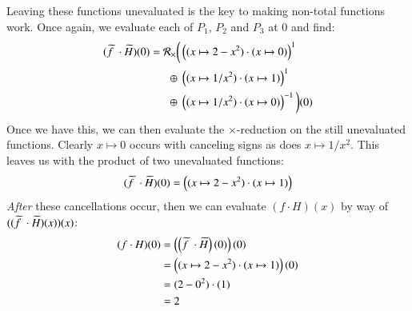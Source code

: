Leaving these functions unevaluated is the key to making non-total functions work.
Once again, we evaluate each of $P_1$, $P_2$ and $P_3$ at 0 and find:
\begin{align*}
	(\pseudo{f\;} \cdot \,\pseudo{\!H})(0) = \mathcal{R}_\times \bigg(
				& \left( (x \mapsto 2-x^2) \cdot (x \mapsto 0) \right)^1 \notag \\
		\oplus \;& \left( (x \mapsto 1/x^2) \cdot (x \mapsto 1) \right)^1 \notag \\
		\oplus \;& \left( (x \mapsto 1/x^2) \cdot (x \mapsto 0) \right)^{-1} 
	\bigg)(0)
\end{align*}
Once we have this, we can then evaluate the $\times$-reduction on the still unevaluated functions.
Clearly $x \mapsto 0$ occurs with canceling signs as does $x \mapsto 1/x^2$.
This leaves us with the product of two unevaluated functions:
\begin{equation*}
	(\pseudo{f\;}\cdot\,\pseudo{\!H})(0) = \left((x \mapsto 2-x^2) \cdot (x \mapsto 1)\right)
\end{equation*}
\emph{After} these cancellations occur, then we can evaluate $(f \cdot H)(x)$ by way of
$((\pseudo{f\;}\cdot\,\pseudo{\!H})(x))(x)$:
\begin{align*}
	(f \cdot H)(0) 
		&= \left(\left(\pseudo{f\;} \cdot \,\pseudo{\!H}\right)(0)\right)(0) \\
		&= \left((x \mapsto 2-x^2) \cdot (x \mapsto 1)\right)(0)\\
		&= (2-0^2)\cdot(1)\\
		&= 2
\end{align*}

